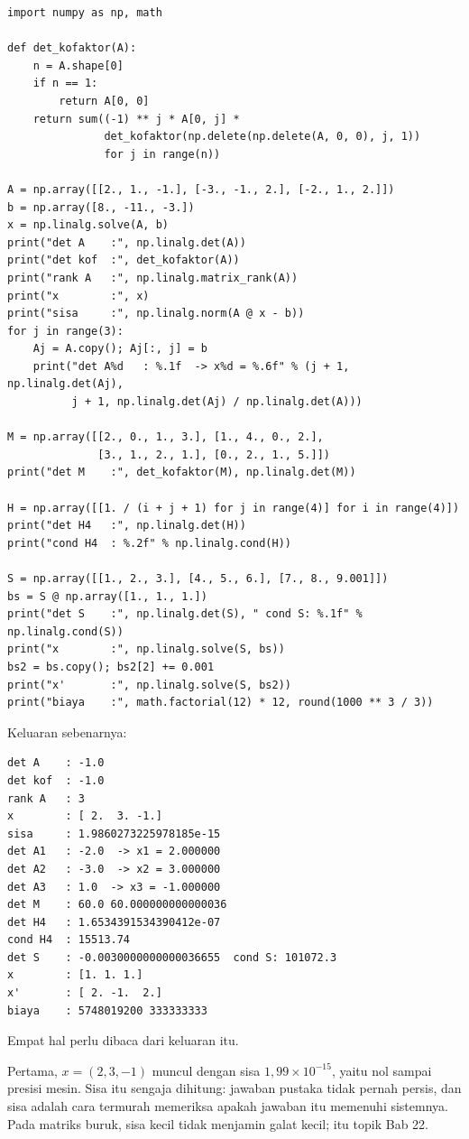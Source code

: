 \begin{lab}
\begin{verbatim}
import numpy as np, math

def det_kofaktor(A):
    n = A.shape[0]
    if n == 1:
        return A[0, 0]
    return sum((-1) ** j * A[0, j] *
               det_kofaktor(np.delete(np.delete(A, 0, 0), j, 1))
               for j in range(n))

A = np.array([[2., 1., -1.], [-3., -1., 2.], [-2., 1., 2.]])
b = np.array([8., -11., -3.])
x = np.linalg.solve(A, b)
print("det A    :", np.linalg.det(A))
print("det kof  :", det_kofaktor(A))
print("rank A   :", np.linalg.matrix_rank(A))
print("x        :", x)
print("sisa     :", np.linalg.norm(A @ x - b))
for j in range(3):
    Aj = A.copy(); Aj[:, j] = b
    print("det A%d   : %.1f  -> x%d = %.6f" % (j + 1, np.linalg.det(Aj),
          j + 1, np.linalg.det(Aj) / np.linalg.det(A)))

M = np.array([[2., 0., 1., 3.], [1., 4., 0., 2.],
              [3., 1., 2., 1.], [0., 2., 1., 5.]])
print("det M    :", det_kofaktor(M), np.linalg.det(M))

H = np.array([[1. / (i + j + 1) for j in range(4)] for i in range(4)])
print("det H4   :", np.linalg.det(H))
print("cond H4  : %.2f" % np.linalg.cond(H))

S = np.array([[1., 2., 3.], [4., 5., 6.], [7., 8., 9.001]])
bs = S @ np.array([1., 1., 1.])
print("det S    :", np.linalg.det(S), " cond S: %.1f" % np.linalg.cond(S))
print("x        :", np.linalg.solve(S, bs))
bs2 = bs.copy(); bs2[2] += 0.001
print("x'       :", np.linalg.solve(S, bs2))
print("biaya    :", math.factorial(12) * 12, round(1000 ** 3 / 3))
\end{verbatim}
Keluaran sebenarnya:
\begin{verbatim}
det A    : -1.0
det kof  : -1.0
rank A   : 3
x        : [ 2.  3. -1.]
sisa     : 1.9860273225978185e-15
det A1   : -2.0  -> x1 = 2.000000
det A2   : -3.0  -> x2 = 3.000000
det A3   : 1.0  -> x3 = -1.000000
det M    : 60.0 60.000000000000036
det H4   : 1.6534391534390412e-07
cond H4  : 15513.74
det S    : -0.0030000000000036655  cond S: 101072.3
x        : [1. 1. 1.]
x'       : [ 2. -1.  2.]
biaya    : 5748019200 333333333
\end{verbatim}
\end{lab}

Empat hal perlu dibaca dari keluaran itu.

Pertama, $x=(2,3,-1)$ muncul dengan sisa $1{,}99\times10^{-15}$, yaitu nol sampai presisi
mesin. Sisa itu sengaja dihitung: jawaban pustaka tidak pernah persis, dan sisa adalah cara
termurah memeriksa apakah jawaban itu memenuhi sistemnya. Pada matriks buruk, sisa kecil
tidak menjamin galat kecil; itu topik Bab 22.

